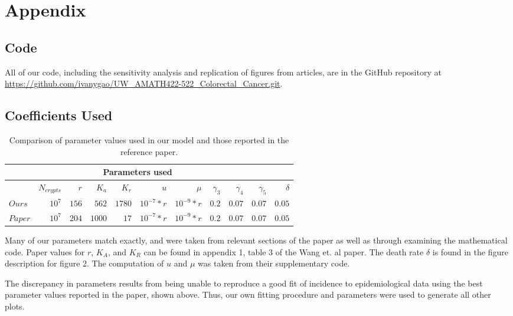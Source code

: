 \section{Appendix}

\subsection{Code}

All of our code, including the sensitivity analysis and replication of figures from articles, are in the GitHub repository at \href{https://github.com/ivanygao/UW_AMATH422-522_Colorectal_Cancer.git}{\url{https://github.com/ivanygao/UW_AMATH422-522_Colorectal_Cancer.git}}.

\subsection{Coefficients Used}

\begin{table}[h]
  \centering
    \begin{tabular}{l|*{10}r}
    \toprule
    \multicolumn{10}{c}{Parameters used} \\
    \midrule
    & $N_{crypts}$ & $r$ & $K_{a}$ & $K_{r}$ & $u$ & $\mu$ & $\gamma _{3}$ & $\gamma _{4}$ & $\gamma _{5}$ & $\delta$ \\
    \midrule
    $Ours$  & $10^7$ & $156$ & $562$ & $1780$ & $10^{-7} * r$ & $10^{-9} * r$ & $0.2$ & $0.07$ & $0.07$ & $0.05$ \\ 
    $Paper$ & $10^7$  & $204$ & $1000$ & $17$ & $10^{-7} * r$ & $10^{-9} * r$  & $0.2$ & $0.07$ & $0.07$ & $0.05$\\ 
    \bottomrule
    \end{tabular}%
  \caption{Comparison of parameter values used in our model and those reported in the reference paper.}
  \label{tab:Params}
\end{table}

Many of our parameters match exactly, and were taken from relevant sections of the paper as well as through examining the mathematical code. Paper values for $r$, $K_A$, and $K_R$ can be found in appendix 1, table 3 of the Wang et. al paper. The death rate $\delta$ is found in the figure description for figure 2. The computation of $u$ and $\mu$ was taken from their supplementary code. 

The discrepancy in parameters results from being unable to reproduce a good fit of incidence to epidemiological data using the best parameter values reported in the paper, shown above.  Thus, our own fitting procedure and parameters were used to generate all other plots.

